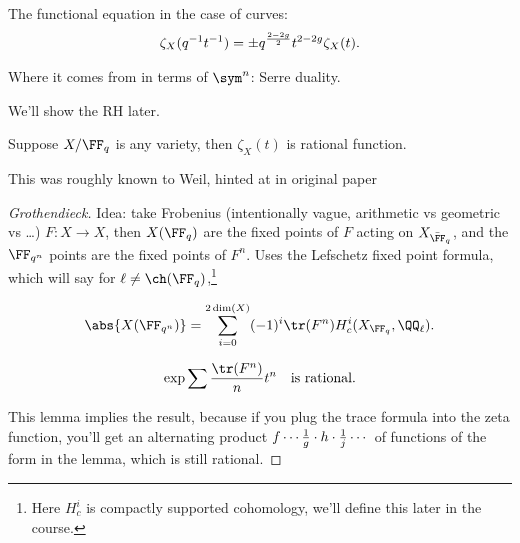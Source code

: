 \begin{theorem}

The functional equation in the case of curves:
\begin{align*}  
\zeta_X(q^{-1} t^{-1} ) = \pm q^{2-2g \over 2} t^{2-2g} \zeta_X(t)
.\end{align*}

\end{theorem}

\begin{exercise}[Important]

Where it comes from in terms of \(\sym^n\): Serre duality.

\end{exercise}

We'll show the RH later.

\begin{theorem}[Dwork]

Suppose \(X/\FF_q\) is any variety, then \(\zeta_X(t)\) is rational
function.

\end{theorem}

This was roughly known to Weil, hinted at in original paper

\begin{proof}[Grothendieck]

Idea: take Frobenius (intentionally vague, arithmetic vs geometric vs
\ldots) \(F:X\to X\), then \(X(\FF_q)\) are the fixed points of \(F\)
acting on \(X_{\bar \FF_q}\), and the \(\FF_{q^n}\) points are the fixed
points of \(F^n\). Uses the Lefschetz fixed point formula, which will
say for \(\ell\neq \ch(\FF_q)\),\footnote{Here \(H^i_c\) is compactly
  supported cohomology, we'll define this later in the course.}

\begin{align*}  
\abs{X(\FF_{q^n})} = \sum_{i=0}^{2\dim(X)} (-1)^i \tr(F^n) H^i_c(X_{\FF_q}, \QQ_\ell)
.\end{align*}

\begin{lemma}

\begin{align*}  
\exp{\sum {\tr(F^n) \over n}t^n  }\quad\text{is rational}
.\end{align*}

\end{lemma}

This lemma implies the result, because if you plug the trace formula
into the zeta function, you'll get an alternating product
\(f \cdots {1\over g} \cdot h \cdot {1\over j} \cdots\) of functions of
the form in the lemma, which is still rational.

\end{proof}

